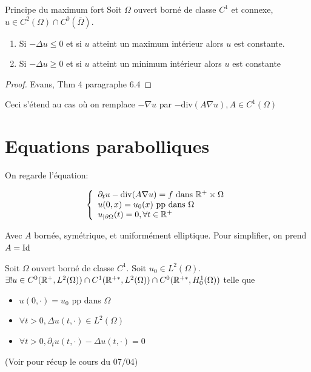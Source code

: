 \documentclass[]{report}
\begin{document}
    \begin{tm}{Principe du maximum fort}{}
        Soit $\Omega$ ouvert borné de classe $C^1$ et connexe, $u\in C^2(\Omega)\cap C^0(\overline{\Omega})$.
        \begin{enumerate}
            \item Si $-\Delta u\le 0$ et si $u$ atteint un maximum intérieur alors $u$ est constante.
            \item Si $-\Delta u\ge 0$ et si $u$ atteint un minimum intérieur alors $u$ est constante
        \end{enumerate}
    \end{tm}

    \begin{proof}
        Evans, Thm 4 paragraphe 6.4
    \end{proof}

    \begin{re}{}{}
        Ceci s'étend au cas où on remplace $-\nabla u$ par $-\text{div} (A\nabla u), A\in C^1(\Omega)$
    \end{re}

    \chapter{Equations parabolliques}

    \begin{center}
        On regarde l'équation:
    \end{center}

    \[\left\{\begin{array}{ll} \partial_t u-\text{div}(A\nabla u)=f\text{ dans $\mathbb{R}^+\times \Omega$}\\ u(0,x)= u_0(x)\text{ pp dans $\Omega$} \\ u_{|\partial \Omega}(t)=0 ,\forall t\in \mathbb{R}^+ \end{array} \right.\]
    
    \begin{center}
        Avec $A$ bornée, symétrique, et uniformément elliptique. Pour simplifier, on prend $A=\text{Id}$
    \end{center}

    \begin{tm}{}{}
        Soit $\Omega$ ouvert borné de classe $C^1$. Soit $u_0\in L^2(\Omega)$.\\
        $\exists! u\in C^0(\mathbb{R}^+,L^2(\Omega))\cap C^1(\mathbb{R}^{+*},L^2(\Omega))\cap C^0(\mathbb{R}^{+*},H_0^1(\Omega))$ telle que
        \begin{itemize}
            \item $u(0,\cdot)=u_0$ pp dans $\Omega$
            \item $\forall t>0,\Delta u(t,\cdot)\in L^2(\Omega)$
            \item $\forall t>0,\partial_t u(t,\cdot)-\Delta u(t,\cdot)=0$
        \end{itemize}
    \end{tm}

    (Voir pour récup le cours du 07/04)
    
\end{document}
